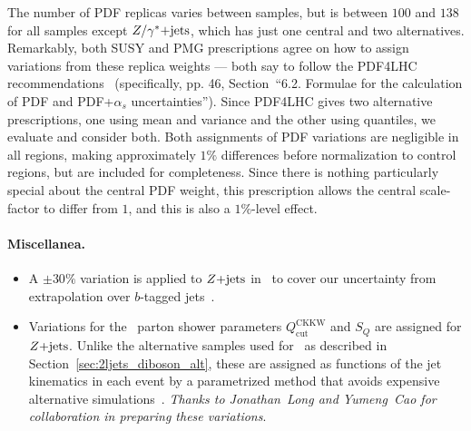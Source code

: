 The number of PDF replicas varies between samples, but is between
$100$ and $138$ for all samples except $Z/\gamma^*\mathrm{+jets}$, which has just one central
and two alternatives.
Remarkably, both SUSY and PMG prescriptions agree on how to assign variations
from these replica weights --- both say to follow the PDF4LHC
recommendations~\cite{PDF4LHC_Butterworth_2016} (specifically, pp. 46,
Section~``6.2. Formulae for the calculation of PDF and PDF+$\alpha_s$
uncertainties'').
Since PDF4LHC gives two alternative prescriptions, one using mean and variance
and the other using quantiles, we evaluate and consider both.
Both assignments of PDF variations are negligible in all regions, making
approximately $1\%$ differences before normalization to control regions, but are
included for completeness.
Since there is nothing particularly special about the central PDF weight,
this prescription allows the central scale-factor to differ from $1$,
and this is also a $1\%$-level effect.

\paragraph{Miscellanea.}
\begin{itemize}
\item A $\pm30\%$ variation is applied to $Z\mathrm{+jets}$ in \crtt\ to cover our
uncertainty from extrapolation over $b$-tagged
jets~\cite{atlas_twiki_susytheoretical}.
\item Variations for the \sherpa\ parton shower parameters
$Q_\textrm{cut}^\textrm{CKKW}$ and
$S_Q$ are assigned for $Z\mathrm{+jets}$.
Unlike the alternative samples used for \diboson\ as described in
Section~\ref{sec:2ljets_diboson_alt}, these are assigned as functions of the
jet kinematics in each event by a parametrized method that avoids expensive
alternative simulations~\cite{Anders:2125718, atlas_twiki_susytheoretical}.
\emph{Thanks to Jonathan~Long and Yumeng~Cao for collaboration in preparing these
variations}.
\end{itemize}



